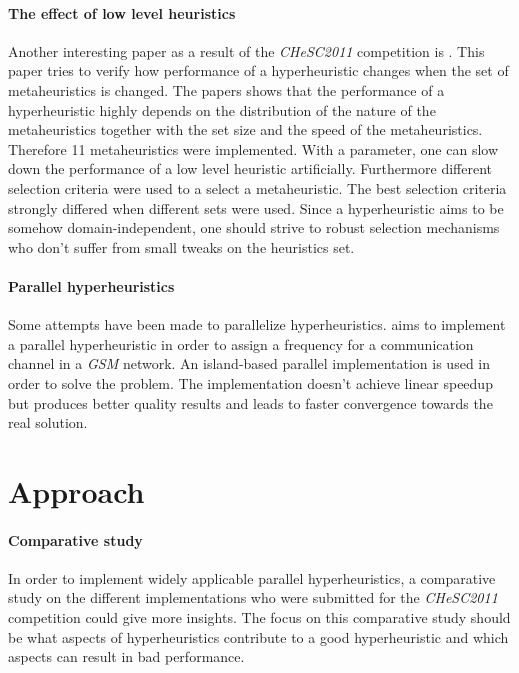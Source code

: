 \documentclass{IEEEconf}
\begin{document}
\paragraph{The effect of low level heuristics}
Another interesting paper as a result of the \emph{CHeSC2011} competition is \cite{Misir:2012:ESL:2402710.2402754}. This paper tries to verify how performance of a hyperheuristic changes when the set of metaheuristics is changed. The papers shows that the performance of a hyperheuristic highly depends on the distribution of the nature of the metaheuristics together with the set size and the speed of the metaheuristics. Therefore 11 metaheuristics were implemented. With a parameter, one can slow down the performance of a low level heuristic artificially. Furthermore different selection criteria were used to a select a metaheuristic. The best selection criteria strongly differed when different sets were used. Since a hyperheuristic aims to be somehow domain-independent, one should strive to robust selection mechanisms who don't suffer from small tweaks on the heuristics set.
\paragraph{Parallel hyperheuristics}
Some attempts have been made to parallelize hyperheuristics. \cite{journals/memetic/SeguraML11} aims to implement a parallel hyperheuristic in order to assign a frequency for a communication channel in a \emph{GSM} network. An island-based parallel implementation is used in order to solve the problem. The implementation doesn't achieve linear speedup but produces better quality results and leads to faster convergence towards the real solution.
\section{Approach}
\paragraph{Comparative study}
In order to implement widely applicable parallel hyperheuristics, a comparative study on the different implementations who were submitted for the \emph{CHeSC2011} competition could give more insights. The focus on this comparative study should be what aspects of hyperheuristics contribute to a good hyperheuristic and which aspects can result in bad performance.
\end{document}
